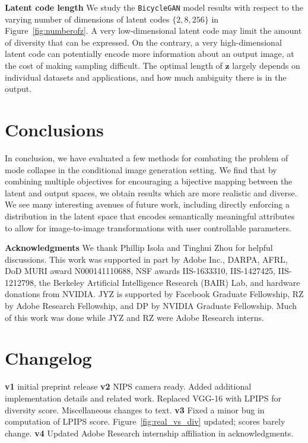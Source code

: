 \documentclass{article}
\newcommand{\bicycle}{\texttt{BicycleGAN}\xspace} \newcommand{\G}{G\xspace}
\newcommand{\z}{\mathbf{z}\xspace}
\begin{document}
{\bf Latent code length} We study the \bicycle model results with respect to the varying number of dimensions of latent codes $\{2, 8, 256\}$ in Figure~\ref{fig:numberofz}. A very low-dimensional latent code may limit the amount of diversity that can be expressed. On the contrary, a very high-dimensional latent code can potentially encode more information about an output image, at the cost of making sampling difficult. The optimal length of $\z$ largely depends on individual datasets and applications, and how much ambiguity there is in the output. 

\vspace{-2mm} 
\section{Conclusions}
\label{sec:conclusion}
\vspace{-2mm}

In conclusion, we have evaluated a few methods for combating the problem of mode collapse in the conditional image generation setting. We find that by combining multiple objectives for encouraging a bijective mapping between the latent and output spaces, we obtain results which are more realistic and diverse. We see many interesting avenues of future work, including directly enforcing a distribution in the latent space that encodes semantically meaningful attributes to allow for image-to-image transformations with user controllable parameters.
 
{\bf Acknowledgments}
\small We thank Phillip Isola and Tinghui Zhou for helpful discussions. 
This work was supported in part by Adobe Inc., DARPA, AFRL, DoD MURI award N000141110688, NSF awards IIS-1633310, IIS-1427425, IIS-1212798, the Berkeley Artificial Intelligence Research (BAIR) Lab, and hardware donations from NVIDIA. JYZ is supported by Facebook Graduate Fellowship, RZ by Adobe Research Fellowship, and DP by NVIDIA Graduate Fellowship. Much of this work was done while JYZ and RZ were Adobe Research interns.
 
\section*{Changelog}
\small
\textbf{v1} initial preprint release
\textbf{v2} NIPS camera ready. Added additional implementation details and related work. Replaced VGG-16 with LPIPS for diversity score. Miscellaneous changes to text.
\textbf{v3} Fixed a minor bug in computation of LPIPS score. Figure~\ref{fig:real_vs_div} updated; scores barely change.
\textbf{v4} Updated Adobe Research internship affiliation in acknowledgments.
 


\end{document}

